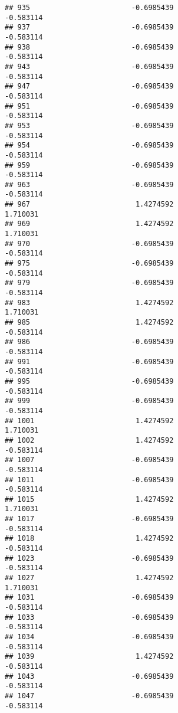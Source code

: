 \documentclass[
]{article}
\begin{document}
\begin{verbatim}
## 935                        -0.6985439                        -0.583114
## 937                        -0.6985439                        -0.583114
## 938                        -0.6985439                        -0.583114
## 943                        -0.6985439                        -0.583114
## 947                        -0.6985439                        -0.583114
## 951                        -0.6985439                        -0.583114
## 953                        -0.6985439                        -0.583114
## 954                        -0.6985439                        -0.583114
## 959                        -0.6985439                        -0.583114
## 963                        -0.6985439                        -0.583114
## 967                         1.4274592                         1.710031
## 969                         1.4274592                         1.710031
## 970                        -0.6985439                        -0.583114
## 975                        -0.6985439                        -0.583114
## 979                        -0.6985439                        -0.583114
## 983                         1.4274592                         1.710031
## 985                         1.4274592                        -0.583114
## 986                        -0.6985439                        -0.583114
## 991                        -0.6985439                        -0.583114
## 995                        -0.6985439                        -0.583114
## 999                        -0.6985439                        -0.583114
## 1001                        1.4274592                         1.710031
## 1002                        1.4274592                        -0.583114
## 1007                       -0.6985439                        -0.583114
## 1011                       -0.6985439                        -0.583114
## 1015                        1.4274592                         1.710031
## 1017                       -0.6985439                        -0.583114
## 1018                        1.4274592                        -0.583114
## 1023                       -0.6985439                        -0.583114
## 1027                        1.4274592                         1.710031
## 1031                       -0.6985439                        -0.583114
## 1033                       -0.6985439                        -0.583114
## 1034                       -0.6985439                        -0.583114
## 1039                        1.4274592                        -0.583114
## 1043                       -0.6985439                        -0.583114
## 1047                       -0.6985439                        -0.583114

\end{verbatim}
\end{document}
